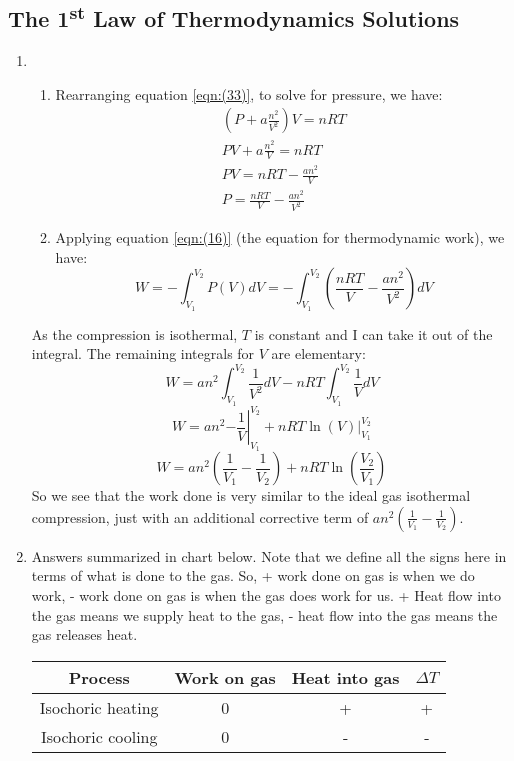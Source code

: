 \subsection{\texorpdfstring{The 1\textsuperscript{st} Law of Thermodynamics Solutions}{The 1st Law of Thermodynamics Solutions}}
\begin{enumerate}
    \item 
    \begin{enumerate} 
    \item Rearranging equation \ref{eqn:(33)}, to solve for pressure, we have:
    \begin{gather*}
        \left(P+a\frac{n^2}{V^2}\right)V = nRT \\
        PV + a\frac{n^2}{V} = nRT \\
        PV = nRT - \frac{an^2}{V} \\
        P = \frac{nRT}{V}-\frac{an^2}{V^2}
    \end{gather*}
    \item Applying equation \ref{eqn:(16)} (the equation for thermodynamic work), we have:
    \[W = -\int_{V_1}^{V_2}P(V)dV = -\int_{V_1}^{V_2}\left(\frac{nRT}{V}-\frac{an^2}{V^2} \right)dV \]
    \end{enumerate}
    As the compression is isothermal, $T$ is constant and I can take it out of the integral. The remaining integrals for $V$ are elementary:
    \[W = an^2\int_{V_1}^{V_2}\frac{1}{V^2}dV - nRT\int_{V_1}^{V_2}\frac{1}{V}dV \]
    \[ W = an^2 \left. -\frac{1}{V}\right|_{V_1}^{V_2} + nRT\left. \ln(V)\right|_{V_1}^{V_2} \]
    \[W = an^2\left(\frac{1}{V_1}-\frac{1}{V_2}\right) + nRT\ln\left(\frac{V_2}{V_1}\right)\]
    So we see that the work done is very similar to the ideal gas isothermal compression, just with an additional corrective term of $an^2\left(\frac{1}{V_1}-\frac{1}{V_2}\right)$.
    \item Answers summarized in chart below. Note that we define all the signs here in terms of what is done to the gas. So, + work done on gas is when we do work, - work done on gas is when the gas does work for us. + Heat flow into the gas means we supply heat to the gas, - heat flow into the gas means the gas releases heat.
\begin{center}
 \begin{tabular}{|c| c | c | c|} 
 \hline
 \textbf{Process} & \textbf{Work on gas} & \textbf{Heat into gas} & $\Delta T$\\ 
 \hline\hline
 Isochoric heating & 0 & + & + \\
 Isochoric cooling & 0 & - & - \\

\end{tabular}
\end{center}
\end{enumerate}
